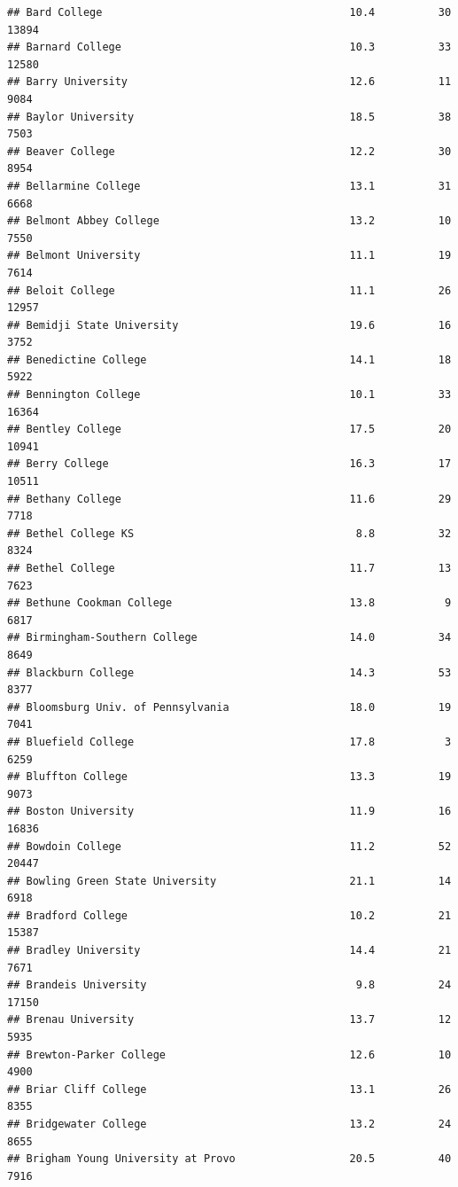 \documentclass[
]{article}
\begin{document}
\begin{verbatim}
## Bard College                                       10.4          30  13894
## Barnard College                                    10.3          33  12580
## Barry University                                   12.6          11   9084
## Baylor University                                  18.5          38   7503
## Beaver College                                     12.2          30   8954
## Bellarmine College                                 13.1          31   6668
## Belmont Abbey College                              13.2          10   7550
## Belmont University                                 11.1          19   7614
## Beloit College                                     11.1          26  12957
## Bemidji State University                           19.6          16   3752
## Benedictine College                                14.1          18   5922
## Bennington College                                 10.1          33  16364
## Bentley College                                    17.5          20  10941
## Berry College                                      16.3          17  10511
## Bethany College                                    11.6          29   7718
## Bethel College KS                                   8.8          32   8324
## Bethel College                                     11.7          13   7623
## Bethune Cookman College                            13.8           9   6817
## Birmingham-Southern College                        14.0          34   8649
## Blackburn College                                  14.3          53   8377
## Bloomsburg Univ. of Pennsylvania                   18.0          19   7041
## Bluefield College                                  17.8           3   6259
## Bluffton College                                   13.3          19   9073
## Boston University                                  11.9          16  16836
## Bowdoin College                                    11.2          52  20447
## Bowling Green State University                     21.1          14   6918
## Bradford College                                   10.2          21  15387
## Bradley University                                 14.4          21   7671
## Brandeis University                                 9.8          24  17150
## Brenau University                                  13.7          12   5935
## Brewton-Parker College                             12.6          10   4900
## Briar Cliff College                                13.1          26   8355
## Bridgewater College                                13.2          24   8655
## Brigham Young University at Provo                  20.5          40   7916

\end{verbatim}
\end{document}
